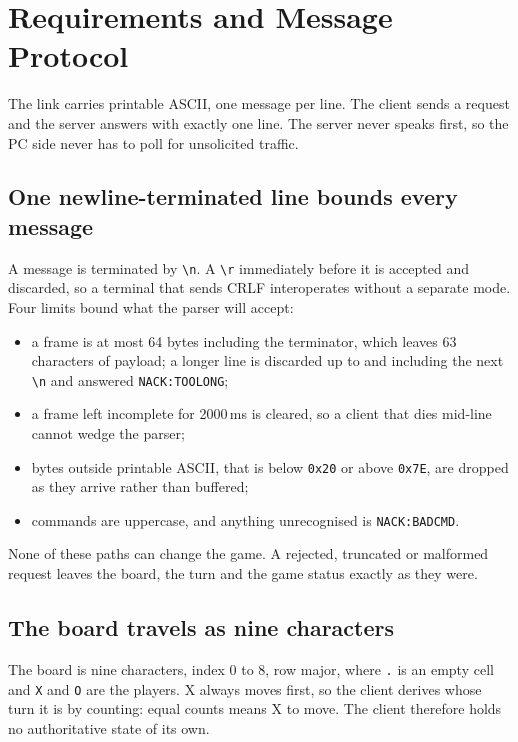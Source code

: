 \section{Requirements and Message Protocol}
\label{sec:protocol}

The link carries printable ASCII, one message per line. The client sends a
request and the server answers with exactly one line. The server never speaks
first, so the PC side never has to poll for unsolicited traffic.

\subsection{One newline-terminated line bounds every message}
A message is terminated by \texttt{\textbackslash n}. A
\texttt{\textbackslash r} immediately before it is accepted and discarded, so a
terminal that sends CRLF interoperates without a separate mode. Four limits
bound what the parser will accept:

\begin{itemize}
  \item a frame is at most 64 bytes including the terminator, which leaves 63
        characters of payload; a longer line is discarded up to and including
        the next \texttt{\textbackslash n} and answered
        \texttt{NACK:TOOLONG};
  \item a frame left incomplete for 2000\,ms is cleared, so a client that dies
        mid-line cannot wedge the parser;
  \item bytes outside printable ASCII, that is below \texttt{0x20} or above
        \texttt{0x7E}, are dropped as they arrive rather than buffered;
  \item commands are uppercase, and anything unrecognised is
        \texttt{NACK:BADCMD}.
\end{itemize}

None of these paths can change the game. A rejected, truncated or malformed
request leaves the board, the turn and the game status exactly as they were.

\subsection{The board travels as nine characters}
The board is nine characters, index 0 to 8, row major, where \texttt{.} is an
empty cell and \texttt{X} and \texttt{O} are the players. X always moves first,
so the client derives whose turn it is by counting: equal counts means X to
move. The client therefore holds no authoritative state of its own.

